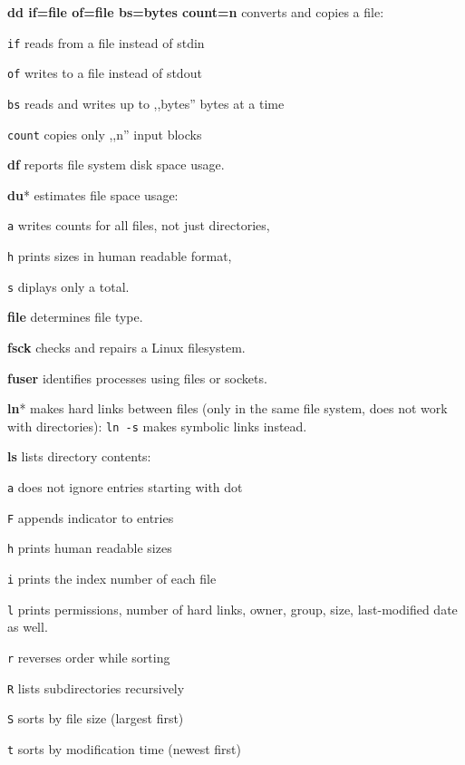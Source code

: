 \textbf{dd if=file of=file bs=bytes count=n} converts and copies a file:
\begin{enumx}
	\item [\texttt{if}] reads from a file instead of stdin
	\item [\texttt{of}] writes to a file instead of stdout
	\item [\texttt{bs}] reads and writes up to ,,bytes'' bytes at a time
	\item [\texttt{count}] copies only ,,n'' input blocks
\end{enumx}

\textbf{df} reports file system disk space usage.

\textbf{du}* estimates file space usage:
\begin{enumx}
	\item [\texttt{a}] writes counts for all files, not just directories,
	\item [\texttt{h}] prints sizes in human readable format,
	\item [\texttt{s}] diplays only a total.
\end{enumx}

\textbf{file} determines file type.

\textbf{fsck} checks and repairs a Linux filesystem.

\textbf{fuser} identifies processes using files or sockets.

\textbf{ln}* makes hard links between files
(only in the same file system, does not work with directories):
\texttt{ln -s} makes symbolic links instead.

\textbf{ls} lists directory contents:
\begin{enumx}
	\item [\texttt{a}] does not ignore entries starting with dot
	\item [\texttt{F}] appends indicator to entries
	\item [\texttt{h}] prints human readable sizes
	\item [\texttt{i}] prints the index number of each file
	\item [\texttt{l}] prints permissions, number of hard links, owner, group, size, last-modified date as well.
	\item [\texttt{r}] reverses order while sorting
	\item [\texttt{R}] lists subdirectories recursively
	\item [\texttt{S}] sorts by file size (largest first)
	\item [\texttt{t}] sorts by modification time (newest first)
\end{enumx}

